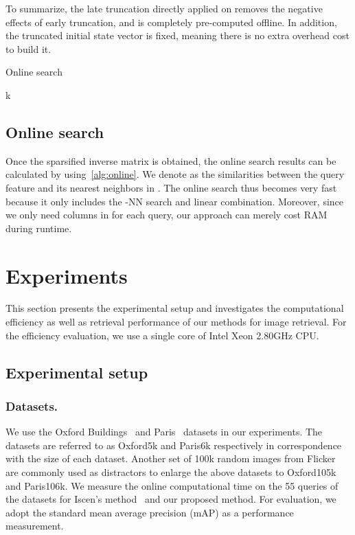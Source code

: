 \documentclass[letterpaper]{article} \usepackage{aaai19}  \usepackage{times}  \usepackage{helvet}  \usepackage{courier}  \usepackage{url}  \usepackage{graphicx}  \frenchspacing  \setlength{\pdfpagewidth}{8.5in}  \setlength{\pdfpageheight}{11in}
\begin{document}
To summarize, the late truncation directly applied on  removes the negative effects of early truncation, and is completely pre-computed offline.
In addition, the truncated initial state vector is fixed, meaning there is no extra overhead cost to build it.

\begin{algorithm}[t]
\caption{Online search}
\label{alg:online}
\begin{algorithmic}[1]
\State 
\State 
\For{}
\State k
\For{}
\State 
\State 
\State 
\State 
\EndFor
\EndFor
\State 
\end{algorithmic}
\end{algorithm}

\subsection{Online search}

Once the sparsified inverse matrix is obtained, the online search results can be calculated by using~\cref{alg:online}.
We denote  as the similarities between the query feature  and its nearest neighbors in .
The online search thus becomes very fast because it only includes the -NN search and linear combination.
Moreover, since we only need  columns in  for each query, our approach can merely cost  RAM during runtime.


\section{Experiments}

This section presents the experimental setup and investigates the computational efficiency as well as retrieval performance of our methods for image retrieval.
For the efficiency evaluation, we use a single core of Intel Xeon 2.80GHz CPU.

\subsection{Experimental setup}

\subsubsection{Datasets.}
We use the Oxford Buildings~\cite{philbin2007object} and Paris~\cite{philbin2008lost} datasets in our experiments.
The datasets are referred to as Oxford5k and Paris6k respectively in correspondence with the size of each dataset.
Another set of 100k random images from Flicker~\cite{philbin2008lost} are commonly used as distractors to enlarge the above datasets to Oxford105k and Paris106k.
We measure the online computational time on the 55 queries of the datasets for Iscen's method~\cite{iscen2017efficient} and our proposed method.
For evaluation, we adopt the standard mean average precision (mAP) as a performance measurement.
\end{document}
